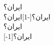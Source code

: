 \documentclass{article}
\begin{document}
\noindent ایران؟\scalebox{-1}{ایران؟}   \\
          ایران؟\scalebox{1}[-1]{ایران؟}\\
          ایران؟\makebox[0mm][l]{%
                    \scalebox{-1}{ایران؟}}\\
                   \scalebox{1}[-1]{ایران؟}
\end{document}
